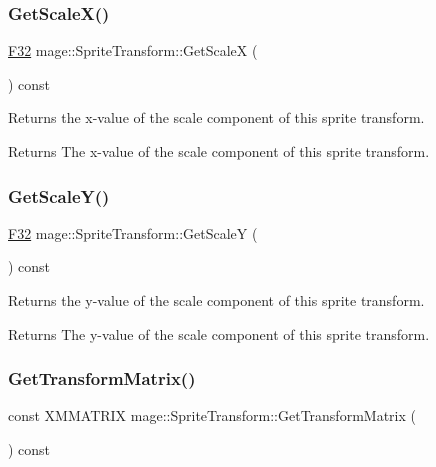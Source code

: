 \subsubsection{\texorpdfstring{Get\+Scale\+X()}{GetScaleX()}}
{\footnotesize\ttfamily \hyperlink{namespacemage_aa97e833b45f06d60a0a9c4fc22ae02c0}{F32} mage\+::\+Sprite\+Transform\+::\+Get\+ScaleX (\begin{DoxyParamCaption}{ }\end{DoxyParamCaption}) const\hspace{0.3cm}{\ttfamily [noexcept]}}

Returns the x-\/value of the scale component of this sprite transform.

\begin{DoxyReturn}{Returns}
The x-\/value of the scale component of this sprite transform. 
\end{DoxyReturn}
\hypertarget{structmage_1_1_sprite_transform_a07010f5d7e781ca641456b18fd16e67f}{}\label{structmage_1_1_sprite_transform_a07010f5d7e781ca641456b18fd16e67f} 
\subsubsection{\texorpdfstring{Get\+Scale\+Y()}{GetScaleY()}}
{\footnotesize\ttfamily \hyperlink{namespacemage_aa97e833b45f06d60a0a9c4fc22ae02c0}{F32} mage\+::\+Sprite\+Transform\+::\+Get\+ScaleY (\begin{DoxyParamCaption}{ }\end{DoxyParamCaption}) const\hspace{0.3cm}{\ttfamily [noexcept]}}

Returns the y-\/value of the scale component of this sprite transform.

\begin{DoxyReturn}{Returns}
The y-\/value of the scale component of this sprite transform. 
\end{DoxyReturn}
\hypertarget{structmage_1_1_sprite_transform_a4e5d58a02d951c021e3e41e4ac183d0d}{}\label{structmage_1_1_sprite_transform_a4e5d58a02d951c021e3e41e4ac183d0d} 
\subsubsection{\texorpdfstring{Get\+Transform\+Matrix()}{GetTransformMatrix()}}
{\footnotesize\ttfamily const X\+M\+M\+A\+T\+R\+IX mage\+::\+Sprite\+Transform\+::\+Get\+Transform\+Matrix (\begin{DoxyParamCaption}{ }\end{DoxyParamCaption}) const\hspace{0.3cm}{\ttfamily [noexcept]}}

